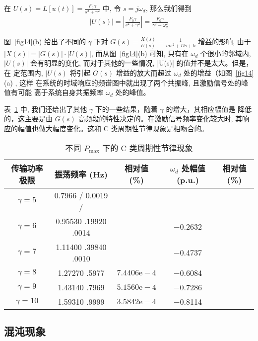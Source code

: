\documentclass[withoutpreface,bwprint]{cumcmthesis} %
\begin{document}
在 $ U(s)=L[u(t)]=\frac{F_{0} \gamma}{s^{2}+\gamma^{2}} $ 中, 令  $s=j \omega_{d} $, 那么我们得到
\begin{align}
\label{eq20}
|U(s)|=\left|\frac{F_{0} \gamma}{s^{2}+\gamma^{2}}\right|=\frac{F_{0} \gamma}{\gamma^{2}-\omega_{d}^{2}}
\end{align}

图~\ref{fig14}(b)  给出了不同的 $ \gamma $ 下对 $ G(s)=\frac{X(s)}{U(s)}=\frac{1}{m s^{2}+D s+k}$  增益的影响, 由于 $ |X(s)|=|G(s)| \cdot|U(s)| $, 而从图~\ref{fig14}(b)  可知, 只有在  $\omega_{d} $ 个很小的邻域内,  $|U(s)|$ 会有明显的变化, 而对于其他的一些情况,  |U(s)|  的值并不是太大。但是，在 定范围内,  $\mid U(s) $ 将引起 $ G(s) $ 增益的放大而超过  $\omega_{d} $ 处的增益（如图~\ref{fig14}(a) , 这样 在系统的时域响应的频谱图中就出现了两个共振峰, 且激励信号处的峰值有可能 高于系统自身共振频率 $ \omega_{d} $ 处的峰值。

表~\ref{tab4} 中, 我们还给出了其他  $\gamma $ 下的一些结果，随着 $ \gamma $ 的增大，其相应幅值是 降低的，这主要是由  $G(s)$  高频段的特性决定的。在激励信号频率变化较大时, 其响应的幅值也做大幅度变化。这和  $\mathrm{C}$  类周期性节律现象是相吻合的。

\begin{table}[h!t]
    \center
    \caption{不同 $P_{\max}$ 下的 C 类周期性节律现象}
    \renewcommand\arraystretch{0.9}
    \begin{tabular}{c|c|c|c|c}
    \hline
    传输功率极限  & 振荡频率 (Hz) & 相对值 (\%) & $\omega_{d}$ 处幅值 (p.u.) &  相对值 (\%) \\
    \hline $\gamma=5$ & 0.7966 / 0.0019 / & & \\
\hline $\gamma=6$ & 0.95530 .19920 .0014 & & $-$0.2632 \\
\hline $\gamma=7$ & 1.11400 .39840 .0010 & &$ -$0.4737 \\
\hline $\gamma=8$ & 1.27270 .5977 & $7.4406 \mathrm{e}-4$ & $-$0.6084 \\
\hline $\gamma=9$ & 1.43140 .7969 & $5.1560 \mathrm{e}-4$ & $-$0.7286 \\
\hline $\gamma=10 $& 1.59310 .9999 & $3.5842 \mathrm{e}-4 $& $-$0.8114 \\
        \hline
    \end{tabular}
     \label{tab4}
    \end{table}

\subsection{混沌现象}
\label{sec5-5}
\end{document}
